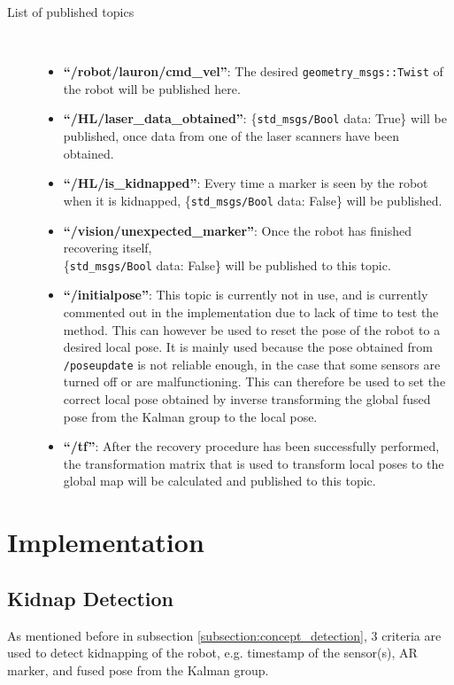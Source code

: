 \begin{description}	
\item[List of published topics]\
	\begin{itemize}
	\item \textbf{``/robot/lauron/cmd\_vel''}: The desired \texttt{geometry\_msgs::Twist} of the robot will be published here.
	\item \textbf{``/HL/laser\_data\_obtained''}: \{\texttt{std\_msgs/Bool} data: True\} will be published, once data from one of the laser scanners have been obtained.
	\item \textbf{``/HL/is\_kidnapped''}: Every time a marker is seen by the robot when it is kidnapped, \{\texttt{std\_msgs/Bool} data: False\} will be published.
	\item \textbf{``/vision/unexpected\_marker''}: Once the robot has finished recovering itself, \\ \{\texttt{std\_msgs/Bool} data: False\} will be published to this topic.
	\item \textbf{``/initialpose''}: This topic is currently not in use, and is currently commented out in the implementation due to lack of time to test the method. This can however be used to reset the pose of the robot to a desired local pose. It is mainly used because the pose obtained from \texttt{/poseupdate} is not reliable enough, in the case that some sensors are turned off or are malfunctioning. This can therefore be used to set the correct local pose obtained by inverse transforming the global fused pose from the Kalman group to the local pose.
	\item \textbf{``/tf''}: After the recovery procedure has been successfully performed, the transformation matrix that is used to transform local poses to the global map will be calculated and published to this topic.
	\end{itemize}
\end{description}

\section{Implementation}\label{implementation}

\subsection{Kidnap Detection}\label{subsection:implementation_detection} 
As mentioned before in subsection \ref{subsection:concept_detection}, 3 criteria are used to detect kidnapping of the robot, e.g. timestamp of the sensor(s), AR marker, and fused pose from the Kalman group. 

